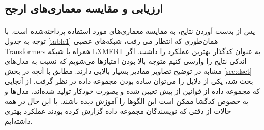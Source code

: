 \subsection{ارزیابی و مقایسه معماری‌های ارجح}
\paragraph{}{
    پس از بدست آوردن نتایج،‌ به مقایسه معماری‌های مورد استفاده پرداخته‌شده است. 
    با توجه به جدول
    \ref{table1}
    همان‌طوری که انتظار می رفت، شبکه‌های عصبی 
    Transformers
    همراه با شبکه LXMERT
    به عنوان کدگذار بهترین عملکرد را داشت. اگر اندکی نتایج را وارسی کنیم
    متوجه بالا بودن امتیازها می‌شویم که 
    نسبت به مدل‌های مشابه در توضیح تصاویر مقادیر بسیار بالایی دارند. مطابق با آنچه در بخش
    \ref{sec:dset}
    بحث شد، یکی از دلایل را می‌توان ساده‌ بودن مجموعه داده در نظر گرفت. از آنجایی 
    که مجموعه داده از قوانین از پیش تعیین شده و بصورت خودکار تولید شده‌اند، مدل‌ها 
    و به خصوص کدگشا ممکن است این الگوها را آموزش دیده باشند. با این حال در 
    همه حالات از دقتی که نویسندگان مجموعه داده گزارش کرده‌ بودند عملکرد بهتری داشته‌ایم. 
    
}
